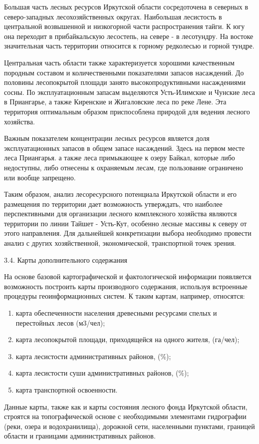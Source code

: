 \documentclass{report}
\begin{document}
Большая часть лесных ресурсов Иркутской области сосредоточена в северных в северо-западных лесохозяйственных округах.
Наибольшая лесистость  в  центральной возвышенной и низкогорной части распространения тайги. К югу она переходит в
прибайкальскую лесостепь, на севере - в лесотундру. На востоке значительная часть территории относится к горному
редколесью и горной тундре.  

Центральная часть области также  характеризуется  хорошими качественным породным составом и количественными показателями
запасов насаждений. До половины  лесопокрытой площади  занято высокопродуктивными насаждениями сосны. По
эксплуатационным запасам выделяются Усть-Илимские и Чунские леса в Приангарье, а также Киренские и Жигаловские леса по
реке Лене. Эта территория оптимальным образом приспособлена природой для ведения лесного хозяйства.

Важным показателем концентрации лесных ресурсов является доля эксплуатационных запасов в общем запасе насаждений. Здесь
на первом месте леса Приангарья. а также леса примыкающее к озеру Байкал, которые либо недоступны, либо отнесены к
охраняемым лесам, где пользование ограничено или вообще запрещено.

Таким образом, анализ лесоресурсного потенциала Иркутской области и его размещения по территории дает возможность
утверждать, что наиболее перспективными для организации лесного комплексного хозяйства являются территории по линии
Тайшет - Усть-Кут, особенно лесные массивы к северу от этого направления. Для дальнейшей конкретизации выбора
необходимо  провести анализ с других хозяйственной, экономической, транспортной точек зрения.

3.4. Карты дополнительного содержания 

На основе базовой картографической и фактологической информации появляется возможность построить карты производного
содержания, используя встроенные процедуры геоинформационных систем. К таким картам, например, относятся:

\begin{enumerate}
\item  карта обеспеченности населения древесными ресурсами спелых и перестойных лесов (м3/чел);
\item  карта лесопокрытой площади, приходящейся на одного жителя, (га/чел);
\item  карта лесистости административных районов, (\%);
\item  карта лесистости суши административных районов, (\%);
\item  карта транспортной освоенности. 
\end{enumerate}
Данные карты, также как и карты состояния лесного фонда Иркутской области, строятся на топографической основе с
необходимыми элементами гидрографии (реки, озера и водохранилища), дорожной сети, населенными пунктами, границей
области и границами административных районов. 
\end{document}

